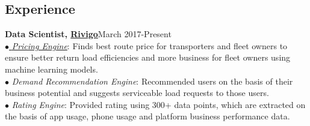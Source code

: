 \documentclass[margin,line]{resume}
\begin{document}
\begin{resume}

    \section{\mysidestyle \bf Experience}
    {\bf Data Scientist, \href{https://www.rivigo.com/}{Rivigo}}\label{sec:\mysidestyle\bfexperience}\hfill March 2017-Present\\
      $\bullet$\href{https://eng.rivigo.com/technology/dynamic-prediction-of-trucking-freight-prices-to-digitize-the-indian-trucking-economy/}{ \emph{ Pricing Engine}}:
    Finds best route price for transporters and fleet owners to ensure better return load efficiencies and more business for fleet owners using machine learning models.\\
  $\bullet$ \emph{Demand Recommendation Engine}:
  Recommended users on the basis of their business potential and suggests serviceable load requests to those users. \\
    $\bullet$ \emph{Rating Engine}:
    Provided rating using 300+ data points, which are extracted on the basis of app usage, phone usage and platform business performance data.


\end{resume}
\end{document}
